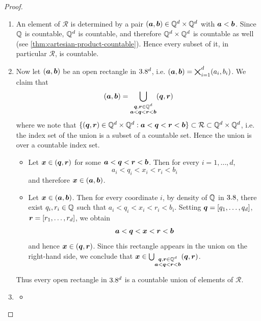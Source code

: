 \begin{proof} %
\leavevmode
\begin{enumerate}[label=(\alph*)]
\item
An element of \(\mathcal{R}\) is determined by a pair
\(
({\boldsymbol{a}},{\boldsymbol{b}}) \in \mathbb{Q}^d \times \mathbb{Q}^d
\)
with \({\boldsymbol{a}}<{\boldsymbol{b}}\).
Since \(\mathbb{Q}\) is countable, \(\mathbb{Q}^d\) is countable, and therefore
\(
\mathbb{Q}^d \times \mathbb{Q}^d
\)
is countable as well (see \autoref{thm:cartesian-product-countable}).
Hence every subset of it, in particular \(\mathcal{R}\), is countable.

\item
Now let \(({\boldsymbol{a}},{\boldsymbol{b}})\) be an open rectangle in \(3.8^d\), i.e.
\(
({\boldsymbol{a}},{\boldsymbol{b}})=\bigtimes_{i=1}^d(a_i,b_i)
\).
We claim that
\[
({\boldsymbol{a}},{\boldsymbol{b}})
=
\bigcup_{\substack{{\boldsymbol{q}},{\boldsymbol{r}}\in\mathbb{Q}^d\\ {\boldsymbol{a}}<{\boldsymbol{q}}<{\boldsymbol{r}}<{\boldsymbol{b}}}}
({\boldsymbol{q}},{\boldsymbol{r}})
\]
where we note that
\(
\{({\boldsymbol{q}},{\boldsymbol{r}})\in \mathbb{Q}^d\times\mathbb{Q}^d : {\boldsymbol{a}}<{\boldsymbol{q}}<{\boldsymbol{r}}<{\boldsymbol{b}}\} \subset \mathcal{R} \subset \mathbb{Q}^d\times\mathbb{Q}^d
\), i.e.
the index set of the union is a subset of a countable set.
Hence the union is over a countable index set.

\begin{itemize}
\item[`$\supseteq$':]
Let
\(
{\boldsymbol{x}}\in({\boldsymbol{q}},{\boldsymbol{r}})
\)
for some
$
{\boldsymbol{a}} < {\boldsymbol{q}} < {\boldsymbol{r}} < {\boldsymbol{b}}
$.
Then for every $i=1, \dots, d$,
\[
a_i < q_i < x_i < r_i < b_i
\]
and therefore \({\boldsymbol{x}}\in({\boldsymbol{a}},{\boldsymbol{b}})\).

\item[`$\subseteq$':]
Let \({\boldsymbol{x}}\in({\boldsymbol{a}},{\boldsymbol{b}})\).
Then for every coordinate \(i\), by density of \(\mathbb{Q}\) in \(3.8\), there exist
\(q_i,r_i\in\mathbb{Q}\) such that
\(
a_i<q_i<x_i<r_i<b_i
\).
Setting
\(
{\boldsymbol{q}}=[q_1,\dots,q_d]
\),
\(
{\boldsymbol{r}}=[r_1,\dots,r_d]
\),
we obtain
\[
{\boldsymbol{a}}<{\boldsymbol{q}}<{\boldsymbol{x}}<{\boldsymbol{r}}<{\boldsymbol{b}}
\]
and hence \({\boldsymbol{x}}\in({\boldsymbol{q}},{\boldsymbol{r}})\).
Since this rectangle appears in the union on the right-hand side, we conclude that
\(
{\boldsymbol{x}}\in
\bigcup_{\substack{{\boldsymbol{q}},{\boldsymbol{r}}\in\mathbb{Q}^d\\ {\boldsymbol{a}}<{\boldsymbol{q}}<{\boldsymbol{r}}<{\boldsymbol{b}}}}
({\boldsymbol{q}},{\boldsymbol{r}})
\).
\end{itemize}

Thus every open rectangle in \(3.8^d\) is a countable union of elements of \(\mathcal{R}\).
\item
\begin{itemize}
\item[`$\subseteq$':]


\end{itemize}
\end{enumerate}
\end{proof}
